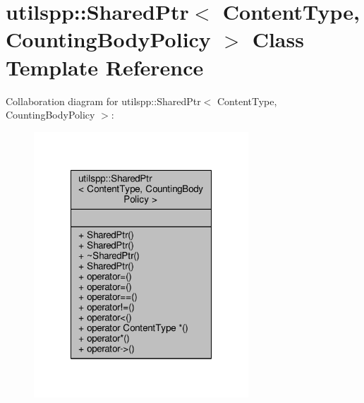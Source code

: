 \hypertarget{classutilspp_1_1SharedPtr}{\section{utilspp\-:\-:Shared\-Ptr$<$ Content\-Type, Counting\-Body\-Policy $>$ Class Template Reference}
\label{classutilspp_1_1SharedPtr}
}


Collaboration diagram for utilspp\-:\-:Shared\-Ptr$<$ Content\-Type, Counting\-Body\-Policy $>$\-:
\nopagebreak
\begin{figure}[H]
\begin{center}
\leavevmode
\includegraphics[width=228pt]{classutilspp_1_1SharedPtr__coll__graph}
\end{center}
\end{figure}
